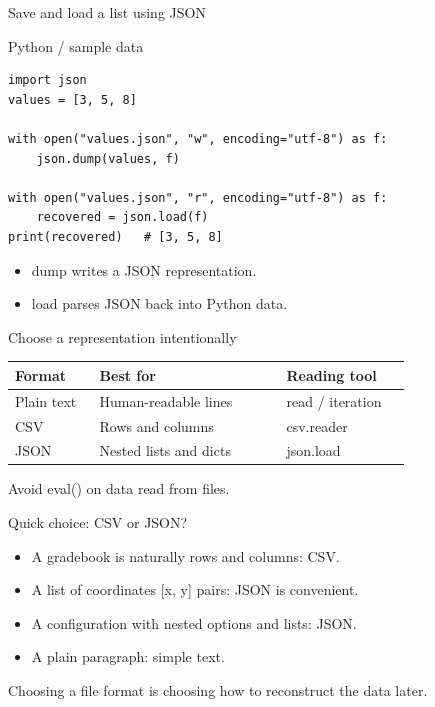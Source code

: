 \documentclass[aspectratio=169,10pt]{beamer}
\begin{document}
\begin{frame}[fragile]{Save and load a list using JSON}
\begin{block}{Python / sample data}\begin{Verbatim}[fontsize=\scriptsize]
import json
values = [3, 5, 8]

with open("values.json", "w", encoding="utf-8") as f:
    json.dump(values, f)

with open("values.json", "r", encoding="utf-8") as f:
    recovered = json.load(f)
print(recovered)   # [3, 5, 8]
\end{Verbatim}
\end{block}
\small\begin{itemize}
\item dump writes a JSON representation.
\item load parses JSON back into Python data.
\end{itemize}
\end{frame}
\begin{frame}[fragile]{Choose a representation intentionally}
\vspace{0.16in}\begin{center}\renewcommand{\arraystretch}{1.5}\begin{tabular}{p{0.19\linewidth}|p{0.42\linewidth}|p{0.29\linewidth}}\hline
\textbf{Format} & \textbf{Best for} & \textbf{Reading tool}\\\hline
Plain text & Human-readable lines & read / iteration\\\hline
CSV & Rows and columns & csv.reader\\\hline
JSON & Nested lists and dicts & json.load\\\hline
\end{tabular}\end{center}
\vspace{0.1in}\begin{keyidea}\small Avoid eval() on data read from files.\end{keyidea}
\end{frame}
\begin{frame}[fragile]{Quick choice: CSV or JSON?}
\begin{itemize}
\item A gradebook is naturally rows and columns: CSV.
\item A list of coordinates [x, y] pairs: JSON is convenient.
\item A configuration with nested options and lists: JSON.
\item A plain paragraph: simple text.
\end{itemize}
\vspace{0.1in}\begin{keyidea}\small Choosing a file format is choosing how to reconstruct the data later.\end{keyidea}
\end{frame}
\end{document}
